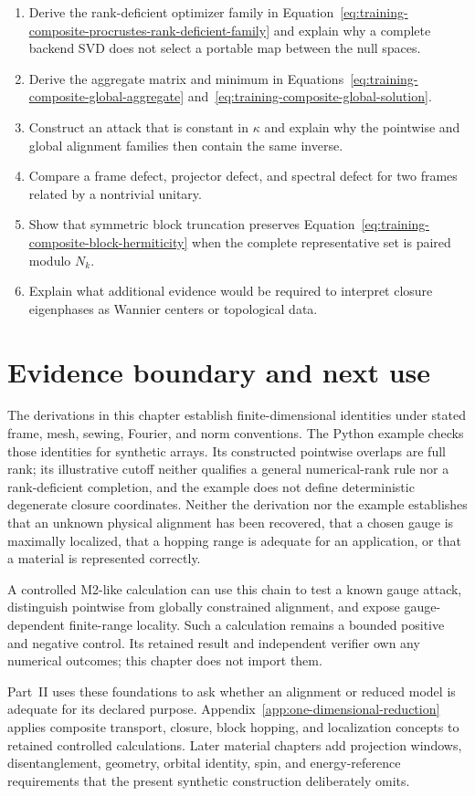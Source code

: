 \begin{enumerate}
  \item Derive the rank-deficient optimizer family in
        Equation~\eqref{eq:training-composite-procrustes-rank-deficient-family}
        and explain why a complete backend SVD does not select a portable map
        between the null spaces.
  \item Derive the aggregate matrix and minimum in
        Equations~\eqref{eq:training-composite-global-aggregate}
        and~\eqref{eq:training-composite-global-solution}.
  \item Construct an attack that is constant in $\kappa$ and explain why the
        pointwise and global alignment families then contain the same inverse.
  \item Compare a frame defect, projector defect, and spectral defect for two
        frames related by a nontrivial unitary.
  \item Show that symmetric block truncation preserves
        Equation~\eqref{eq:training-composite-block-hermiticity} when the
        complete representative set is paired modulo $N_k$.
  \item Explain what additional evidence would be required to interpret closure
        eigenphases as Wannier centers or topological data.
\end{enumerate}

\section{Evidence boundary and next use}

The derivations in this chapter establish finite-dimensional identities under
stated frame, mesh, sewing, Fourier, and norm conventions. The Python example
checks those identities for synthetic arrays. Its constructed pointwise
overlaps are full rank; its illustrative cutoff neither qualifies a general
numerical-rank rule nor a rank-deficient completion, and the example does not
define deterministic degenerate closure coordinates. Neither the derivation
nor the example establishes that an unknown physical alignment has been
recovered, that a chosen gauge is maximally
localized, that a hopping range is adequate for an application, or that a
material is represented correctly.

A controlled M2-like calculation can use this chain to test a known gauge
attack, distinguish pointwise from globally constrained alignment, and expose
gauge-dependent finite-range locality. Such a calculation remains a bounded
positive and negative control. Its retained result and independent verifier own
any numerical outcomes; this chapter does not import them.

Part~II uses these foundations to ask whether an alignment or reduced model is
adequate for its declared purpose. Appendix~\ref{app:one-dimensional-reduction}
applies composite transport, closure, block hopping, and localization concepts
to retained controlled calculations. Later material chapters add projection
windows, disentanglement, geometry, orbital identity, spin, and energy-reference
requirements that the present synthetic construction deliberately omits.
